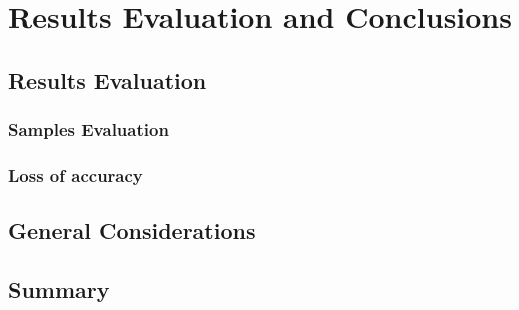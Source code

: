\chapter{Results Evaluation and Conclusions}
\section{Results Evaluation}
\subsection{Samples Evaluation}
\subsection{Loss of accuracy}
\section{General Considerations}
\label{sec:considerations}
\section{Summary}